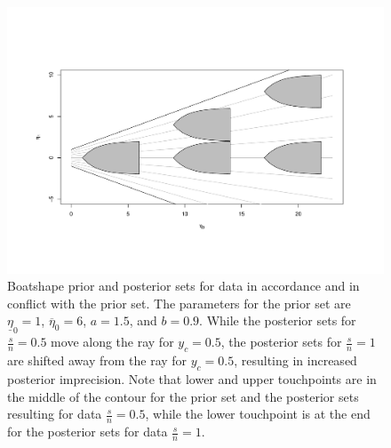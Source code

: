 \documentclass[runningheads,a4paper]{llncs}
\newcommand{\ul}[1]{\underline{#1}}
\newcommand{\ol}[1]{\overline{#1}}
\def\ezl{\ul{\eta}_0}
\def\ezu{\ol{\eta}_0}
\begin{document}
\begin{figure}  %
\centering
\includegraphics[width=\textwidth]{R/boatshape-posterior-mik}%
\caption[Boatshape prior and posterior sets for data in accordance and in conflict with the prior set.]%
{Boatshape prior and posterior sets for data in accordance and in conflict with the prior set.
The parameters for the prior set are $\ezl=1$, $\ezu=6$, $a=1.5$, and $b=0.9$.
While the posterior sets for $\frac{s}{n}=0.5$ move along the ray for $y_c=0.5$,
the posterior sets for $\frac{s}{n}=1$ are shifted away from the ray for $y_c=0.5$,
resulting in increased posterior imprecision.
Note that lower and upper touchpoints are in the middle of the contour
for the prior set and the posterior sets resulting for data $\frac{s}{n}=0.5$,
while the lower touchpoint is at the end for the posterior sets for data $\frac{s}{n}=1$.}
\label{fig:boatshape-posterior-mik}
\end{figure}
\end{document}
